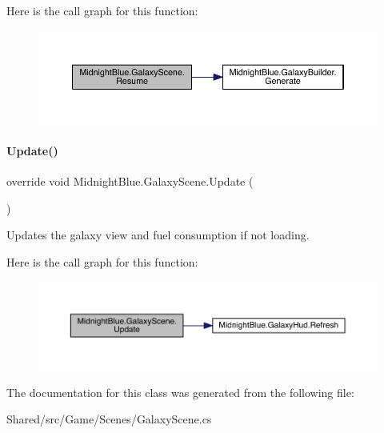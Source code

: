 Here is the call graph for this function\+:\nopagebreak
\begin{figure}[H]
\begin{center}
\leavevmode
\includegraphics[width=350pt]{class_midnight_blue_1_1_galaxy_scene_ab641e6727cdb64dc6487e9a229521692_cgraph}
\end{center}
\end{figure}
\hypertarget{class_midnight_blue_1_1_galaxy_scene_a9dfa66406143ed20f4d534c768f05a78}{}\label{class_midnight_blue_1_1_galaxy_scene_a9dfa66406143ed20f4d534c768f05a78} 
\paragraph{\texorpdfstring{Update()}{Update()}}
{\footnotesize\ttfamily override void Midnight\+Blue.\+Galaxy\+Scene.\+Update (\begin{DoxyParamCaption}{ }\end{DoxyParamCaption})\hspace{0.3cm}{\ttfamily [inline]}}



Updates the galaxy view and fuel consumption if not loading. 

Here is the call graph for this function\+:\nopagebreak
\begin{figure}[H]
\begin{center}
\leavevmode
\includegraphics[width=350pt]{class_midnight_blue_1_1_galaxy_scene_a9dfa66406143ed20f4d534c768f05a78_cgraph}
\end{center}
\end{figure}


The documentation for this class was generated from the following file\+:\begin{DoxyCompactItemize}
\item 
Shared/src/\+Game/\+Scenes/Galaxy\+Scene.\+cs\end{DoxyCompactItemize}
